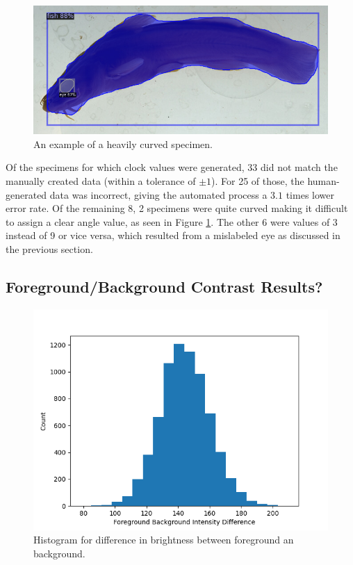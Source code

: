 \documentclass[conference]{IEEEtran}
\begin{document}
\begin{figure}[H]
  \centering
  \includegraphics[width=0.49\linewidth]{images/curved1}
  \caption{An example of a heavily curved specimen.}
  \label{fig:curvedFish}
\end{figure}
Of the specimens for which clock values were generated, 33 did not match the manually created data (within a tolerance of \(\pm{}1\)).
For 25 of those, the human-generated data was incorrect, giving the automated process a \(3.1\) times lower error rate. Of the remaining 8, 2 specimens were quite curved making it difficult to assign a clear angle value, as
seen in Figure \ref{fig:curvedFish}.
The other 6 were values of 3 instead of 9 or vice versa, which resulted from
a mislabeled eye as discussed in the previous section.

\subsection{Foreground/Background Contrast Results?}
\begin{figure}[H]
  \centering
  \includegraphics[width=\linewidth]{images/histo}
  \caption{Histogram for difference in brightness between foreground an background.}
\end{figure}
\end{document}

